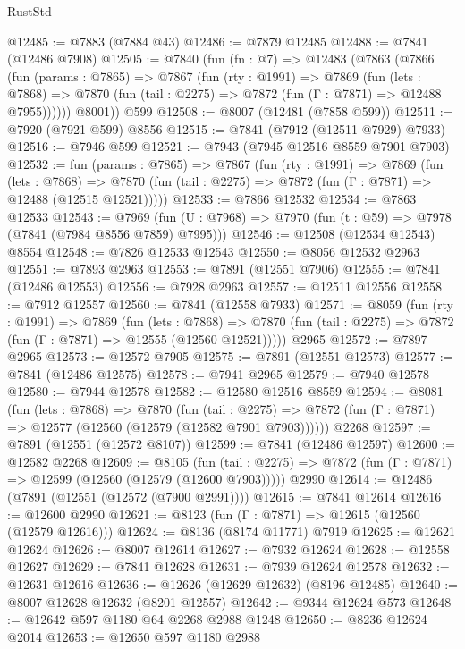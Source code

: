 \begin{lexlean}{RustStd}
\begin{coremodule}
{\begin{coremodule}
{{{{{{{{{{{{{{{{{{{{{{{{{{{{{{{{{{{{{{{{{{{{{{{{{{{{{{@12485 := @7883 (@7884 @43)
@12486 := @7879 @12485
@12488 := @7841 (@12486 @7908)
@12505 := @7840
    (fun (fn : @7) =>
    @12483
      (@7863
        (@7866
          (fun (params : @7865) =>
          @7867
            (fun (rty : @1991) =>
            @7869
              (fun (lets : @7868) =>
              @7870 (fun (tail : @2275) => @7872 (fun (Γ : @7871) => @12488 @7955))))))
        @8001))
    @599
@12508 := @8007 (@12481 (@7858 @599))
@12511 := @7920 (@7921 @599) @8556
@12515 := @7841 (@7912 (@12511 @7929) @7933)
@12516 := @7946 @599
@12521 := @7943 (@7945 @12516 @8559 @7901 @7903)
@12532 := fun (params : @7865) =>
  @7867
    (fun (rty : @1991) =>
    @7869
      (fun (lets : @7868) =>
      @7870 (fun (tail : @2275) => @7872 (fun (Γ : @7871) => @12488 (@12515 @12521)))))
@12533 := @7866 @12532
@12534 := @7863 @12533
@12543 := @7969
    (fun (U : @7968) => @7970 (fun (t : @59) => @7978 (@7841 (@7984 @8556 @7859) @7995)))
@12546 := @12508 (@12534 @12543) @8554
@12548 := @7826 @12533 @12543
@12550 := @8056 @12532 @2963
@12551 := @7893 @2963
@12553 := @7891 (@12551 @7906)
@12555 := @7841 (@12486 @12553)
@12556 := @7928 @2963
@12557 := @12511 @12556
@12558 := @7912 @12557
@12560 := @7841 (@12558 @7933)
@12571 := @8059
    (fun (rty : @1991) =>
    @7869
      (fun (lets : @7868) =>
      @7870 (fun (tail : @2275) => @7872 (fun (Γ : @7871) => @12555 (@12560 @12521)))))
    @2965
@12572 := @7897 @2965
@12573 := @12572 @7905
@12575 := @7891 (@12551 @12573)
@12577 := @7841 (@12486 @12575)
@12578 := @7941 @2965
@12579 := @7940 @12578
@12580 := @7944 @12578
@12582 := @12580 @12516 @8559
@12594 := @8081
    (fun (lets : @7868) =>
    @7870
      (fun (tail : @2275) =>
      @7872 (fun (Γ : @7871) => @12577 (@12560 (@12579 (@12582 @7901 @7903))))))
    @2268
@12597 := @7891 (@12551 (@12572 @8107))
@12599 := @7841 (@12486 @12597)
@12600 := @12582 @2268
@12609 := @8105
    (fun (tail : @2275) => @7872 (fun (Γ : @7871) => @12599 (@12560 (@12579 (@12600 @7903)))))
    @2990
@12614 := @12486 (@7891 (@12551 (@12572 (@7900 @2991))))
@12615 := @7841 @12614
@12616 := @12600 @2990
@12621 := @8123 (fun (Γ : @7871) => @12615 (@12560 (@12579 @12616)))
@12624 := @8136 (@8174 @11771) @7919
@12625 := @12621 @12624
@12626 := @8007 @12614
@12627 := @7932 @12624
@12628 := @12558 @12627
@12629 := @7841 @12628
@12631 := @7939 @12624 @12578
@12632 := @12631 @12616
@12636 := @12626 (@12629 @12632) (@8196 @12485)
@12640 := @8007 @12628 @12632 (@8201 @12557)
@12642 := @9344 @12624 @573
@12648 := @12642 @597 @1180 @64 @2268 @2988 @1248
@12650 := @8236 @12624 @2014
@12653 := @12650 @597 @1180 @2988
}}}}}}}}}}}}}}}}}}}}}}}}}}}}}}}}}}}}}}}}}}}}}}}}}}}}}}
\end{coremodule}}
\end{coremodule}
\end{lexlean}
